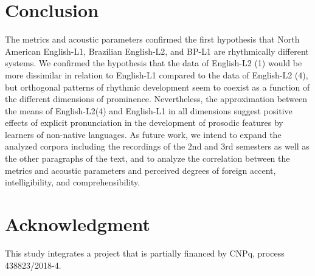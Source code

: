 \section{Conclusion}
The metrics and acoustic parameters confirmed the first hypothesis that North
American English-L1, Brazilian English-L2, and BP-L1 are rhythmically
different systems. We confirmed the hypothesis that the data of English-L2 (1)
would be more dissimilar in relation to English-L1 compared to the data of
English-L2 (4), but orthogonal patterns of rhythmic development seem to coexist
as a function of the different dimensions of prominence. Nevertheless, the
approximation between the means of English-L2(4) and English-L1 in all
dimensions suggest positive effects of explicit pronunciation in the
development of prosodic features by learners of non-native languages.  As
future work, we intend to expand the analyzed corpora including the recordings
of the 2nd and 3rd semesters as well as the other paragraphs of the text, and
to analyze the correlation between the metrics and acoustic parameters and
perceived degrees of foreign accent, intelligibility, and comprehensibility.  



\section{Acknowledgment}

This study integrates a project that is partially financed by CNPq, process 438823/2018-4.





